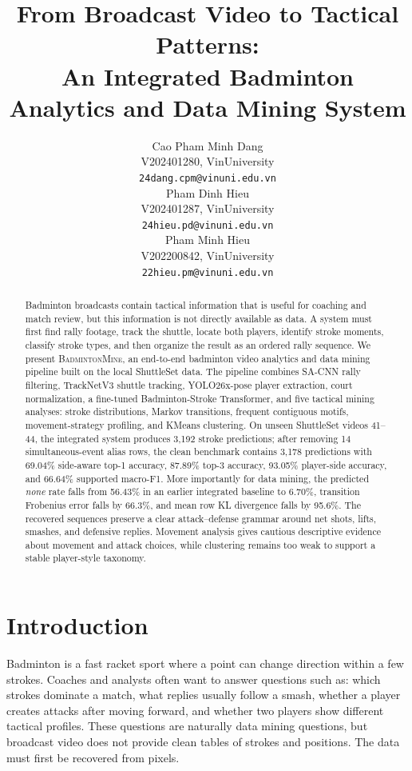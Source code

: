 \documentclass{article}
\title{From Broadcast Video to Tactical Patterns:\\
An Integrated Badminton Analytics and Data Mining System}
\author{%
  Cao Pham Minh Dang \\
  V202401280, VinUniversity \\
  \texttt{24dang.cpm@vinuni.edu.vn} \\
  \And
  Pham Dinh Hieu \\
  V202401287, VinUniversity \\
  \texttt{24hieu.pd@vinuni.edu.vn} \\
  \And
  Pham Minh Hieu \\
  V202200842, VinUniversity \\
  \texttt{22hieu.pm@vinuni.edu.vn} \\
}
\newcommand{\method}{\textsc{BadmintonMine}}
\begin{document}
\maketitle

\begin{abstract}
Badminton broadcasts contain tactical information that is useful for coaching
and match review, but this information is not directly available as data. A
system must first find rally footage, track the shuttle, locate both players,
identify stroke moments, classify stroke types, and then organize the result
as an ordered rally sequence. We present \method, an end-to-end badminton video
analytics and data mining pipeline built on the local ShuttleSet data. The
pipeline combines SA-CNN rally filtering, TrackNetV3 shuttle tracking,
YOLO26x-pose player extraction, court normalization, a fine-tuned
Badminton-Stroke Transformer, and five tactical mining analyses: stroke
distributions, Markov transitions, frequent contiguous motifs,
movement-strategy profiling, and KMeans clustering. On unseen ShuttleSet
videos 41--44, the integrated system produces 3,192 stroke predictions; after
removing 14 simultaneous-event alias rows, the clean benchmark contains 3,178
predictions with 69.04\% side-aware top-1 accuracy, 87.89\% top-3 accuracy,
93.05\% player-side accuracy, and 66.64\% supported macro-F1. More
importantly for data mining, the predicted \emph{none} rate falls from 56.43\%
in an earlier integrated baseline to 6.70\%, transition Frobenius error falls
by 66.3\%, and mean row KL divergence falls by 95.6\%. The recovered sequences
preserve a clear attack--defense grammar around net shots, lifts, smashes, and
defensive replies. Movement analysis gives cautious descriptive evidence about
movement and attack choices, while clustering remains too weak to support a
stable player-style taxonomy.
\end{abstract}

\section{Introduction}

Badminton is a fast racket sport where a point can change direction within a
few strokes. Coaches and analysts often want to answer questions such as:
which strokes dominate a match, what replies usually follow a smash, whether a
player creates attacks after moving forward, and whether two players show
different tactical profiles. These questions are naturally data mining
questions, but broadcast video does not provide clean tables of strokes and
positions. The data must first be recovered from pixels.
\end{document}
